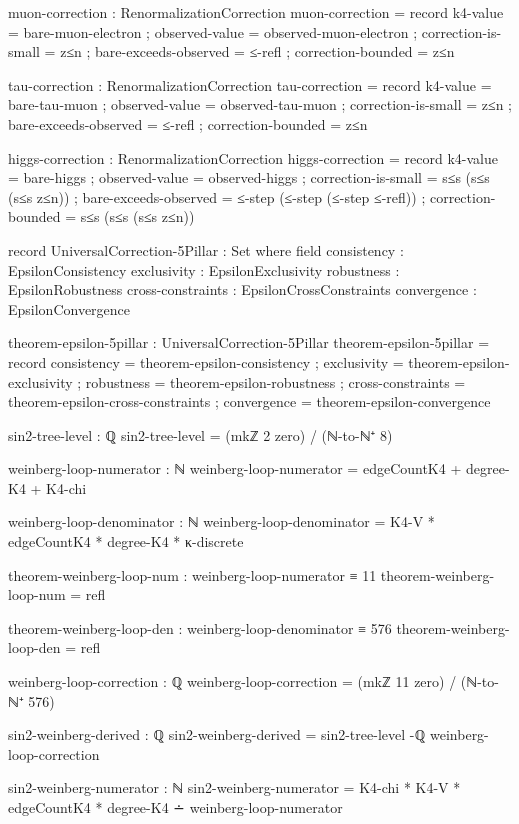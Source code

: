 \documentclass[11pt,a4paper]{book}
\begin{document}
\begin{code}
muon-correction : RenormalizationCorrection
muon-correction = record
  { k4-value = bare-muon-electron
  ; observed-value = observed-muon-electron
  ; correction-is-small = z≤n
  ; bare-exceeds-observed = ≤-refl
  ; correction-bounded = z≤n
  }

tau-correction : RenormalizationCorrection
tau-correction = record
  { k4-value = bare-tau-muon
  ; observed-value = observed-tau-muon
  ; correction-is-small = z≤n
  ; bare-exceeds-observed = ≤-refl
  ; correction-bounded = z≤n
  }

higgs-correction : RenormalizationCorrection
higgs-correction = record
  { k4-value = bare-higgs
  ; observed-value = observed-higgs
  ; correction-is-small = s≤s (s≤s (s≤s z≤n))
  ; bare-exceeds-observed = ≤-step (≤-step (≤-step ≤-refl))
  ; correction-bounded = s≤s (s≤s (s≤s z≤n))
  }

record UniversalCorrection-5Pillar : Set where
  field
    consistency : EpsilonConsistency
    exclusivity : EpsilonExclusivity
    robustness : EpsilonRobustness
    cross-constraints : EpsilonCrossConstraints
    convergence : EpsilonConvergence

theorem-epsilon-5pillar : UniversalCorrection-5Pillar
theorem-epsilon-5pillar = record
  { consistency = theorem-epsilon-consistency
  ; exclusivity = theorem-epsilon-exclusivity
  ; robustness = theorem-epsilon-robustness
  ; cross-constraints = theorem-epsilon-cross-constraints
  ; convergence = theorem-epsilon-convergence
  }


sin2-tree-level : ℚ
sin2-tree-level = (mkℤ 2 zero) / (ℕ-to-ℕ⁺ 8)

weinberg-loop-numerator : ℕ
weinberg-loop-numerator = edgeCountK4 + degree-K4 + K4-chi

weinberg-loop-denominator : ℕ
weinberg-loop-denominator = K4-V * edgeCountK4 * degree-K4 * κ-discrete

theorem-weinberg-loop-num : weinberg-loop-numerator ≡ 11
theorem-weinberg-loop-num = refl

theorem-weinberg-loop-den : weinberg-loop-denominator ≡ 576
theorem-weinberg-loop-den = refl

weinberg-loop-correction : ℚ
weinberg-loop-correction = (mkℤ 11 zero) / (ℕ-to-ℕ⁺ 576)

sin2-weinberg-derived : ℚ
sin2-weinberg-derived = sin2-tree-level -ℚ weinberg-loop-correction

sin2-weinberg-numerator : ℕ
sin2-weinberg-numerator = K4-chi * K4-V * edgeCountK4 * degree-K4 ∸ weinberg-loop-numerator


\end{code}
\end{document}
